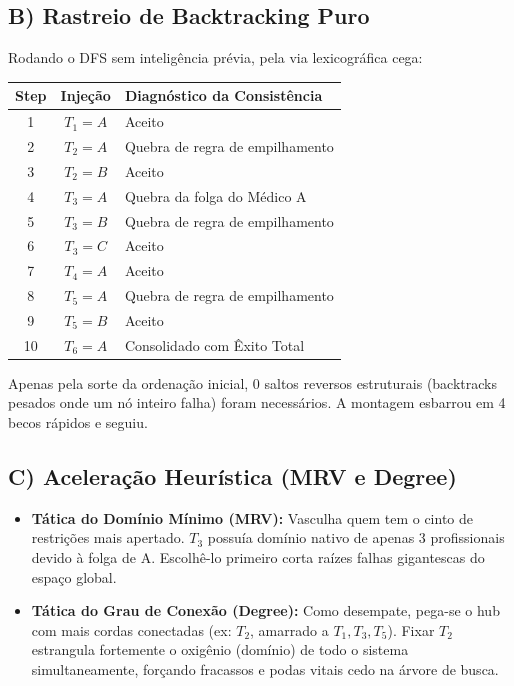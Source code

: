 \subsection*{B) Rastreio de Backtracking Puro}

Rodando o DFS sem inteligência prévia, pela via lexicográfica cega:

\begin{table}[H]
\centering
\begin{tabular}{|c|c|l|}
\hline
\textbf{Step} & \textbf{Injeção} & \textbf{Diagnóstico da Consistência} \\ \hline
1 & $T_1 = A$ & Aceito \\ \hline
2 & $T_2 = A$ & Quebra de regra de empilhamento \\ \hline
3 & $T_2 = B$ & Aceito \\ \hline
4 & $T_3 = A$ & Quebra da folga do Médico A \\ \hline
5 & $T_3 = B$ & Quebra de regra de empilhamento \\ \hline
6 & $T_3 = C$ & Aceito \\ \hline
7 & $T_4 = A$ & Aceito \\ \hline
8 & $T_5 = A$ & Quebra de regra de empilhamento \\ \hline
9 & $T_5 = B$ & Aceito \\ \hline
10 & $T_6 = A$ & Consolidado com Êxito Total \\ \hline
\end{tabular}
\end{table}

Apenas pela sorte da ordenação inicial, 0 saltos reversos estruturais (backtracks pesados onde um nó inteiro falha) foram necessários. A montagem esbarrou em 4 becos rápidos e seguiu.

\subsection*{C) Aceleração Heurística (MRV e Degree)}

\begin{itemize}
    \item \textbf{Tática do Domínio Mínimo (MRV):} Vasculha quem tem o cinto de restrições mais apertado. $T_3$ possuía domínio nativo de apenas 3 profissionais devido à folga de A. Escolhê-lo primeiro corta raízes falhas gigantescas do espaço global.
    \item \textbf{Tática do Grau de Conexão (Degree):} Como desempate, pega-se o hub com mais cordas conectadas (ex: $T_2$, amarrado a $T_1, T_3, T_5$). Fixar $T_2$ estrangula fortemente o oxigênio (domínio) de todo o sistema simultaneamente, forçando fracassos e podas vitais cedo na árvore de busca.
\end{itemize}

